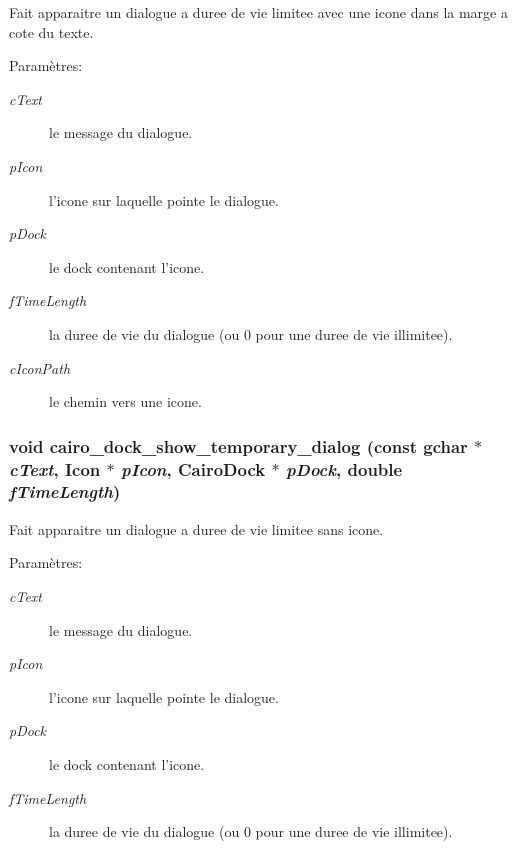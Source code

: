 Fait apparaitre un dialogue a duree de vie limitee avec une icone dans la marge a cote du texte. \begin{Desc}
\item[Param\`{e}tres:]
\begin{description}
\item[{\em c\-Text}]le message du dialogue. \item[{\em p\-Icon}]l'icone sur laquelle pointe le dialogue. \item[{\em p\-Dock}]le dock contenant l'icone. \item[{\em f\-Time\-Length}]la duree de vie du dialogue (ou 0 pour une duree de vie illimitee). \item[{\em c\-Icon\-Path}]le chemin vers une icone. \end{description}
\end{Desc}
\subsubsection{\setlength{\rightskip}{0pt plus 5cm}void cairo\_\-dock\_\-show\_\-temporary\_\-dialog (const gchar $\ast$ {\em c\-Text}, {\bf Icon} $\ast$ {\em p\-Icon}, {\bf Cairo\-Dock} $\ast$ {\em p\-Dock}, double {\em f\-Time\-Length})}\label{cairo-dock-dialogs_8c_4d3f63e631b202426cf7b84b7b24388c}


Fait apparaitre un dialogue a duree de vie limitee sans icone. \begin{Desc}
\item[Param\`{e}tres:]
\begin{description}
\item[{\em c\-Text}]le message du dialogue. \item[{\em p\-Icon}]l'icone sur laquelle pointe le dialogue. \item[{\em p\-Dock}]le dock contenant l'icone. \item[{\em f\-Time\-Length}]la duree de vie du dialogue (ou 0 pour une duree de vie illimitee). \end{description}
\end{Desc}
